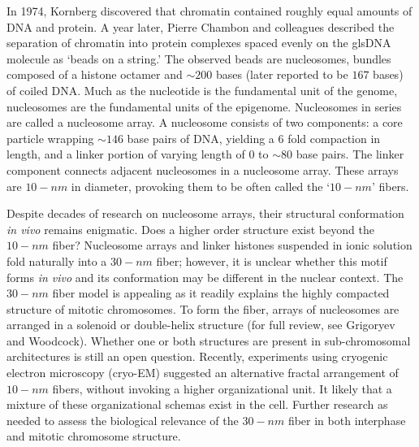 In 1974, Kornberg discovered that chromatin contained roughly equal amounts of \gls{DNA} and protein\cite{kornberg1974}.  A year later, Pierre Chambon
and colleagues described the separation of chromatin into protein complexes spaced evenly on the gls{DNA} molecule as `beads on a string.'\cite{oudet1975}
The observed beads are nucleosomes, bundles composed of a histone octamer and $\sim200$ bases (later reported to be $167$ bases\cite{robinson2006}) of
coiled \gls{DNA}. Much as the nucleotide is the fundamental unit of the genome, nucleosomes are the fundamental units of the epigenome.  Nucleosomes in
series are called a \gls{nucleosome array}.  A nucleosome consists of two components: a core particle wrapping $\sim146$ base pairs of DNA, yielding a
6 fold compaction in length, and a linker portion of varying length of $0$ to $\sim80$ base pairs.  The linker component connects adjacent nucleosomes
in a nucleosome array\cite{wu2007}\cite{hansen2012}.  These arrays are $10-nm$ in diameter, provoking them to be often called the `$10-nm$' fibers.

Despite decades of research on nucleosome arrays, their structural conformation \textit{\gls{in vivo}} remains enigmatic.   Does a higher order structure
exist beyond the $10-nm$ fiber?  Nucleosome arrays and linker histones suspended in ionic solution fold naturally into a $30-nm$ fiber\cite{tremethick2007};
however, it is unclear whether this motif forms \textit{\gls{in vivo}} and its conformation may be different in the nuclear context\cite{bian2012}.
The $30-nm$ fiber model is appealing as it readily explains the highly compacted structure of mitotic chromosomes.  To form the fiber, arrays of nucleosomes
are arranged in a solenoid or double-helix structure (for full review, see Grigoryev and Woodcock\cite{grigoryev2012}).  Whether one or both structures
are present in sub-chromosomal architectures is still an open question\cite{song2014}.  Recently, experiments using cryogenic electron microscopy
(cryo-EM) suggested an alternative fractal arrangement of $10-nm$ fibers, without invoking a higher organizational unit\cite{nishino2012}\cite{hansen2012}.
It likely that a mixture of these organizational schemas exist in the cell.  Further research as needed to assess the biological relevance of the $30-nm$ fiber in
both interphase and mitotic chromosome structure.

